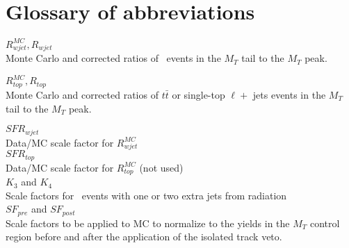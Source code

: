 \section{Glossary of abbreviations}

$R^{MC}_{wjet}, R_{wjet}$ \\
Monte Carlo and corrected ratios of \wjets\ events in the $M_T$ tail to the $M_T$ peak.

$R^{MC}_{top},  R_{top}$ \\
Monte Carlo and corrected ratios of $t\bar{t}$ or single-top $\ell +$ jets events in the $M_T$ tail to the $M_T$ peak.

$SFR_{wjet}$ \\
Data/MC scale factor for $R^{MC}_{wjet}$ \\

$SFR_{top}$ \\
Data/MC scale factor for $R^{MC}_{top}$ (not used) \\

$K_3$ and $K_4$ \\
Scale factors for \ttdl\ events with one or two extra jets from
radiation \\

$SF_{pre}$ and $SF_{post}$ \\
Scale factors to be applied to MC to normalize to the yields in the 
$M_T$ control region before and after the application of the isolated
track veto.

